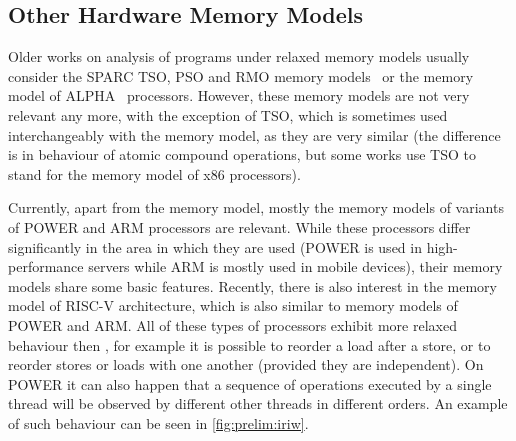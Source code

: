 \subsection{Other Hardware Memory Models}

Older works on analysis of programs under relaxed memory models usually
consider the SPARC TSO, PSO and RMO memory models~ or the memory
model of ALPHA~ processors.
However, these memory models are not very relevant any more, with the exception
of TSO, which is sometimes used interchangeably with the \xtso memory model, as
they are very similar (the difference is in behaviour of atomic compound
operations, but some works use TSO to stand for the memory model of x86 processors).

Currently, apart from the \xtso memory model, mostly the memory models of
variants of POWER and ARM processors are relevant.
While these processors differ significantly in the area in which they are used
(POWER is used in high-performance servers while ARM is mostly used in mobile
devices), their memory models share some basic features.
Recently, there is also interest in the memory model of RISC-V architecture, which is also similar to memory models of POWER and ARM.
All of these types of processors exhibit more relaxed behaviour then \xtso,
for example it is possible to reorder a load after a store, or to reorder
stores or loads with one another (provided they are independent).
On POWER it can also happen that a sequence of operations executed by a single thread will be observed by different other threads in different orders.
An example of such behaviour can be seen in \autoref{fig:prelim:iriw}.

